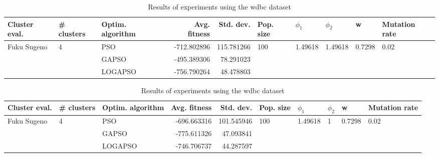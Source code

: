 \documentclass{article}
\begin{document}
\begin{table}
\centering
\caption{Results of experiments using the wdbc dataset}
\begin{tabular}{lllrrlllll}
\toprule
               Cluster eval. &        \# clusters & Optim. algorithm &  Avg. fitness &  Std. dev. &            Pop. size &               $\phi_{1}$ &               $\phi_{2}$ &                       w &         Mutation rate \\
\midrule
\multirow{3}{*}{Fuku Sugeno} & \multirow{3}{*}{4} &              PSO &   -712.802896 & 115.781266 & \multirow{3}{*}{100} & \multirow{3}{*}{1.49618} & \multirow{3}{*}{1.49618} & \multirow{3}{*}{0.7298} & \multirow{3}{*}{0.02} \\
                             &                    &            GAPSO &   -495.389306 &  78.291023 &                      &                          &                          &                         &                       \\
                             &                    &          LOGAPSO &   -756.790264 &  48.478803 &                      &                          &                          &                         &                       \\
\bottomrule
\end{tabular}
\end{table}
\begin{table}
\centering
\caption{Results of experiments using the wdbc dataset}
\begin{tabular}{lllrrlllll}
\toprule
               Cluster eval. &        \# clusters & Optim. algorithm &  Avg. fitness &  Std. dev. &            Pop. size &               $\phi_{1}$ &         $\phi_{2}$ &                       w &         Mutation rate \\
\midrule
\multirow{3}{*}{Fuku Sugeno} & \multirow{3}{*}{4} &              PSO &   -696.663316 & 101.545946 & \multirow{3}{*}{100} & \multirow{3}{*}{1.49618} & \multirow{3}{*}{1} & \multirow{3}{*}{0.7298} & \multirow{3}{*}{0.02} \\
                             &                    &            GAPSO &   -775.611326 &  47.093841 &                      &                          &                    &                         &                       \\
                             &                    &          LOGAPSO &   -746.706737 &  44.287597 &                      &                          &                    &                         &                       \\
\bottomrule
\end{tabular}
\end{table}
\end{document}
